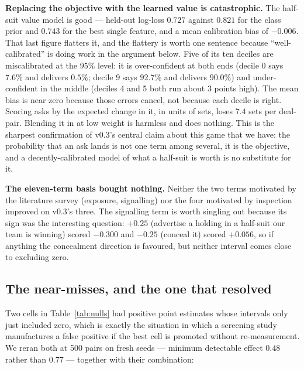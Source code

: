 \documentclass[11pt,a4paper]{article}
\begin{document}
\textbf{Replacing the objective with the learned value is catastrophic.} The
half-suit value model is good --- held-out log-loss $0.727$ against $0.821$ for
the class prior and $0.743$ for the best single feature, and a mean calibration
bias of $-0.006$. That last figure flatters it, and the flattery is worth one
sentence because ``well-calibrated'' is doing work in the argument below. Five
of its ten deciles are miscalibrated at the $95\%$ level: it is over-confident
at both ends (decile 0 says $7.6\%$ and delivers $0.5\%$; decile 9 says $92.7\%$
and delivers $90.0\%$) and under-confident in the middle (deciles 4 and 5 both
run about $3$ points high). The mean bias is near zero because those errors
cancel, not because each decile is right. Scoring asks by the expected change in
it, in units of sets, loses $7.4$ sets per deal-pair. Blending it in at low
weight is harmless and does nothing. This is the sharpest confirmation of v0.3's
central claim about this game that we have: the probability that an ask lands is
not one term among several, it is the objective, and a decently-calibrated model of
what a half-suit is worth is no substitute for it.

\textbf{The eleven-term basis bought nothing.} Neither the two terms motivated
by the literature survey (exposure, signalling) nor the four motivated by
inspection improved on v0.3's three. The signalling term is worth singling out
because its sign was the interesting question: $+0.25$ (advertise a holding in a
half-suit our team is winning) scored $-0.300$ and $-0.25$ (conceal it) scored
$+0.056$, so if anything the concealment direction is favoured, but neither
interval comes close to excluding zero.

\subsection{The near-misses, and the one that resolved}
\label{sec:res-replication}

Two cells in Table~\ref{tab:nulls} had positive point estimates whose intervals
only just included zero, which is exactly the situation in which a screening
study manufactures a false positive if the best cell is promoted without
re-measurement. We reran both at 500 pairs on fresh seeds --- minimum detectable
effect $0.48$ rather than $0.77$ --- together with their combination:
\end{document}
